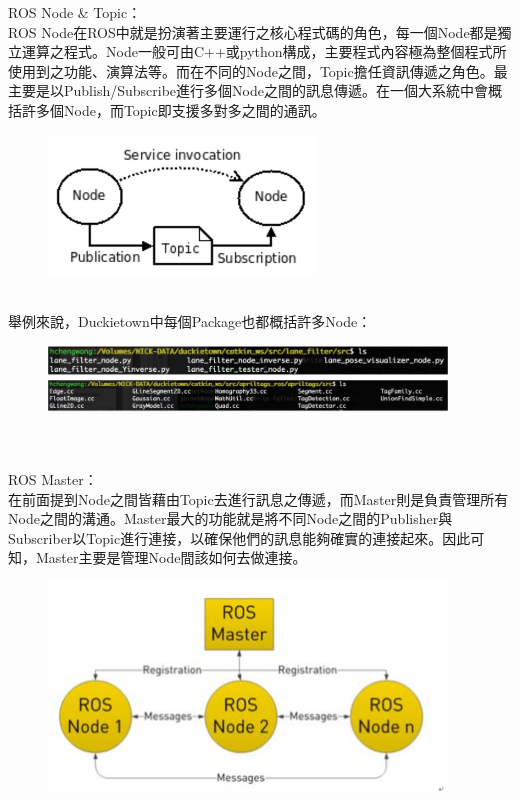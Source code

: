 \documentclass{article}
\begin{document}
ROS Node \& Topic：
\\ROS Node在ROS中就是扮演著主要運行之核心程式碼的角色，每一個Node都是獨立運算之程式。Node一般可由C++或python構成，主要程式內容極為整個程式所使用到之功能、演算法等。而在不同的Node之間，Topic擔任資訊傳遞之角色。最主要是以Publish/Subscribe進行多個Node之間的訊息傳遞。在一個大系統中會概括許多個Node，而Topic即支援多對多之間的通訊。
\begin{figure}[htp]
    \begin{center}
        \includegraphics[width=200pt]{pic/圖片18.jpg}
    \end{center}
\end{figure}
\\舉例來說，Duckietown中每個Package也都概括許多Node：
\\
\begin{figure}[htp]
    \begin{center}
        \includegraphics[width=300pt]{pic/圖片19.jpg}
    \end{center}
\end{figure}
\\
\\ROS Master：
\\在前面提到Node之間皆藉由Topic去進行訊息之傳遞，而Master則是負責管理所有Node之間的溝通。Master最大的功能就是將不同Node之間的Publisher與Subscriber以Topic進行連接，以確保他們的訊息能夠確實的連接起來。因此可知，Master主要是管理Node間該如何去做連接。
\begin{figure}[htp]
    \begin{center}
        \includegraphics[width=300pt]{pic/圖片20.jpg}
    \end{center}
\end{figure}
\end{document}

